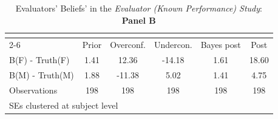 \begin{table}[htbp]\centering
\caption{Evaluators' Beliefs' in the \textit{Evaluator (Known Performance) Study}: \textbf{Panel B}}
\begin{tabular}{l*{5}{c}}
\hline\hline
                &\multicolumn{5}{c}{}                             \\\cmidrule(lr){2-6}
                &\multicolumn{1}{c}{Prior}&\multicolumn{1}{c}{Overconf.}&\multicolumn{1}{c}{Undercon.}&\multicolumn{1}{c}{Bayes post}&\multicolumn{1}{c}{Post}\\
\hline
B(F) - Truth(F) &     1.41&    12.36&   -14.18&     1.61&    18.60\\
B(M) - Truth(M) &     1.88&   -11.38&     5.02&     1.41&     4.75\\
\hline
Observations    &      198&      198&      198&      198&      198\\
\hline\hline
\multicolumn{6}{l}{\footnotesize SEs clustered at subject level}\\
\end{tabular}
\end{table}
